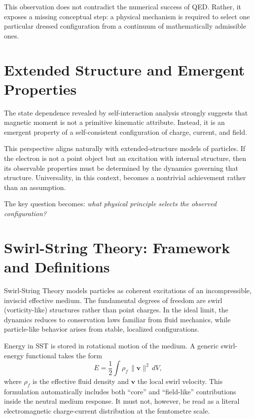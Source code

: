 \documentclass[pdflatex,sn-mathphys-num]{sn-jnl}
\theoremstyle{thmstyleone}
\theoremstyle{thmstyletwo}
\theoremstyle{thmstylethree}
\begin{document}
        This observation does not contradict the numerical success of QED. Rather, it exposes a missing conceptual step: a physical mechanism is required to select one particular dressed configuration from a continuum of mathematically admissible ones.

    \section{Extended Structure and Emergent Properties}
        \label{sec:extended}

        The state dependence revealed by self-interaction analysis strongly suggests that magnetic moment is not a primitive kinematic attribute. Instead, it is an emergent property of a self-consistent configuration of charge, current, and field.

        This perspective aligns naturally with extended-structure models of particles. If the electron is not a point object but an excitation with internal structure, then its observable properties must be determined by the dynamics governing that structure. Universality, in this context, becomes a nontrivial achievement rather than an assumption.

        The key question becomes: \emph{what physical principle selects the observed configuration?}

    \section{Swirl-String Theory: Framework and Definitions}
        \label{sec:framework}

        Swirl-String Theory models particles as coherent excitations of an incompressible, inviscid effective medium. The fundamental degrees of freedom are swirl (vorticity-like) structures rather than point charges. In the ideal limit, the dynamics reduces to conservation laws familiar from fluid mechanics, while particle-like behavior arises from stable, localized configurations.

        Energy in SST is stored in rotational motion of the medium. A generic swirl-energy functional takes the form
        \begin{equation}
            E = \frac{1}{2}\int \rho_{\!f}\,\lVert \mathbf{v} \rVert^2\, dV,
        \end{equation}
        where $\rho_{\!f}$ is the effective fluid density and $\mathbf{v}$ the local swirl velocity. This formulation automatically includes both ``core'' and ``field-like'' contributions inside the neutral medium response. It must not, however, be read as a literal electromagnetic charge-current distribution at the femtometre scale.
\end{document}
